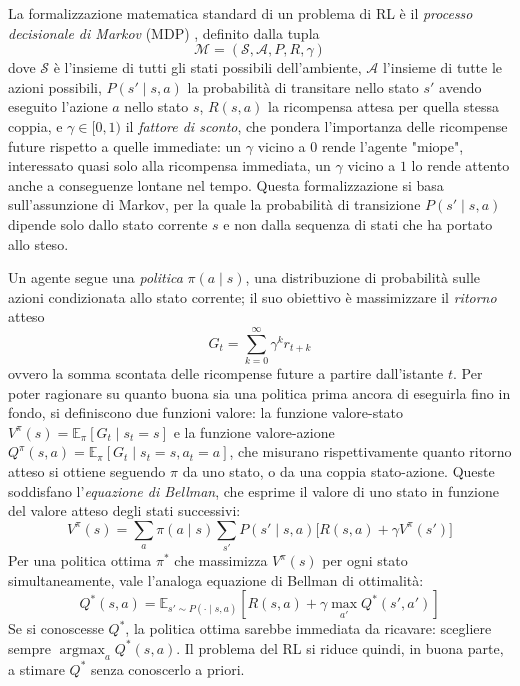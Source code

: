 La formalizzazione matematica standard di un problema di RL è il
\emph{processo decisionale di Markov} (MDP) \citep{suttonbarto2018},
definito dalla tupla
\[\mathcal{M} = (\mathcal{S}, \mathcal{A}, P, R, \gamma)\]
dove $\mathcal{S}$ è l'insieme di tutti gli stati possibili dell'ambiente,
$\mathcal{A}$ l'insieme di tutte le azioni possibili, $P(s' \mid s,a)$ la
probabilità di transitare nello stato $s'$ avendo eseguito l'azione $a$
nello stato $s$, $R(s,a)$ la ricompensa attesa per quella stessa coppia, e
$\gamma \in [0,1)$ il \emph{fattore di sconto}, che pondera l'importanza
delle ricompense future rispetto a quelle immediate: un $\gamma$ vicino a
$0$ rende l'agente "miope", interessato quasi solo alla ricompensa
immediata, un $\gamma$ vicino a $1$ lo rende attento anche a conseguenze
lontane nel tempo. Questa formalizzazione si basa sull'assunzione di Markov, per la quale la
probabilità di transizione $P(s'\mid s,a)$ dipende solo dallo stato
corrente $s$ e non dalla sequenza di stati che ha portato allo steso.

Un agente segue una \emph{politica} $\pi(a \mid s)$, una distribuzione
di probabilità sulle azioni condizionata allo stato corrente; il suo
obiettivo è massimizzare il \emph{ritorno} atteso
\[G_t = \sum_{k=0}^{\infty} \gamma^k r_{t+k}\]
ovvero la somma scontata delle ricompense future a partire dall'istante
$t$. Per poter ragionare su quanto buona sia una politica prima ancora di
eseguirla fino in fondo, si definiscono due funzioni valore: la
funzione valore-stato $V^\pi(s) = \mathbb{E}_\pi[G_t \mid s_t = s]$ e la
funzione valore-azione $Q^\pi(s,a) = \mathbb{E}_\pi[G_t \mid s_t=s,
    a_t=a]$, che misurano rispettivamente quanto ritorno atteso si ottiene
seguendo $\pi$ da uno stato, o da una coppia stato-azione. Queste
soddisfano l'\emph{equazione di Bellman}, che esprime il valore di uno
stato in funzione del valore atteso degli stati successivi:
\begin{equation}
  V^\pi(s) = \sum_a \pi(a\mid s) \sum_{s'} P(s'\mid s,a) \big[R(s,a) + \gamma V^\pi(s')\big]
\end{equation}
Per una politica ottima $\pi^*$ che massimizza $V^\pi(s)$ per ogni stato
simultaneamente, vale l'analoga equazione di Bellman di ottimalità:
\begin{equation}
  Q^*(s,a) = \mathbb{E}_{s' \sim P(\cdot \mid s,a)}\left[
    R(s,a) + \gamma \max_{a'} Q^*(s', a')
    \right]
  \label{eq:bellman-optimal}
\end{equation}
Se si conoscesse $Q^*$, la politica ottima sarebbe immediata da ricavare:
scegliere sempre $\operatorname*{argmax}_a Q^*(s,a)$. Il problema del RL
si riduce quindi, in buona parte, a stimare $Q^*$ senza conoscerlo a
priori.

